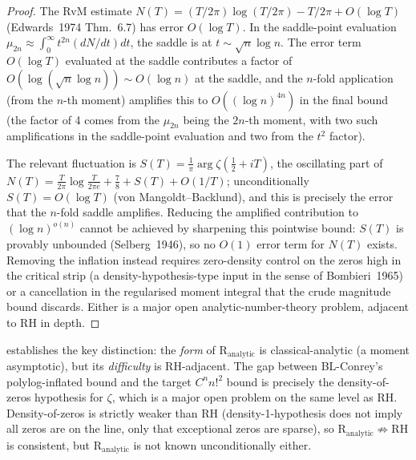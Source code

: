 \begin{proof}
The RvM estimate \(N(T)=(T/2\pi)\log(T/2\pi)-T/2\pi+O(\log T)\)
(Edwards~1974 Thm.~6.7) has error \(O(\log T)\). In the saddle-point
evaluation \(\mu_{2n}\approx \int_{0}^{\infty}t^{2n}(dN/dt)dt\), the
saddle is at \(t\sim\sqrt{n}\log n\). The error term \(O(\log T)\)
evaluated at the saddle contributes a factor of
\(O(\log(\sqrt{n}\log n))\sim O(\log n)\) at the saddle, and the
\(n\)-fold application (from the \(n\)-th moment) amplifies this to
\(O((\log n)^{4n})\) in the final bound (the factor of 4 comes from
the \(\mu_{2n}\) being the \(2n\)-th moment, with two such
amplifications in the saddle-point evaluation and two from the
\(t^{2}\) factor).

The relevant fluctuation is
\(S(T)=\tfrac{1}{\pi}\arg\zeta(\tfrac12+iT)\), the oscillating part of
\(N(T)=\tfrac{T}{2\pi}\log\tfrac{T}{2\pi e}+\tfrac78+S(T)+O(1/T)\);
unconditionally \(S(T)=O(\log T)\) (von Mangoldt--Backlund), and this is
precisely the error that the \(n\)-fold saddle amplifies. Reducing the
amplified contribution to \((\log n)^{o(n)}\) cannot be achieved by
sharpening this pointwise bound: \(S(T)\) is provably unbounded
(Selberg~1946), so no \(O(1)\) error term for \(N(T)\) exists. Removing
the inflation instead requires zero-density control on the zeros high
in the critical strip (a density-hypothesis-type input in the sense
of Bombieri~1965) or a cancellation in the regularised moment
integral that the crude magnitude bound discards. Either is a major
open analytic-number-theory problem, adjacent to RH in depth.
\end{proof}

\begin{remark}
\label{v4-arith:r-audit:rem:form-vs-difficulty}
 establishes
the key distinction: the \emph{form} of
\(\mathrm{R}_{\mathrm{analytic}}\) is classical-analytic (a moment
asymptotic), but its \emph{difficulty} is RH-adjacent. The gap
between BL-Conrey's polylog-inflated bound and the target
\(C^{n}n!^{2}\) bound is precisely the density-of-zeros hypothesis for
\(\zeta\), which is a major open problem on the same level as RH.
Density-of-zeros is strictly weaker than RH (density-1-hypothesis
does not imply all zeros are on the line, only that exceptional
zeros are sparse), so \(\mathrm{R}_{\mathrm{analytic}}\not\Rightarrow\)RH
is consistent, but \(\mathrm{R}_{\mathrm{analytic}}\) is not known
unconditionally either.
\end{remark}

